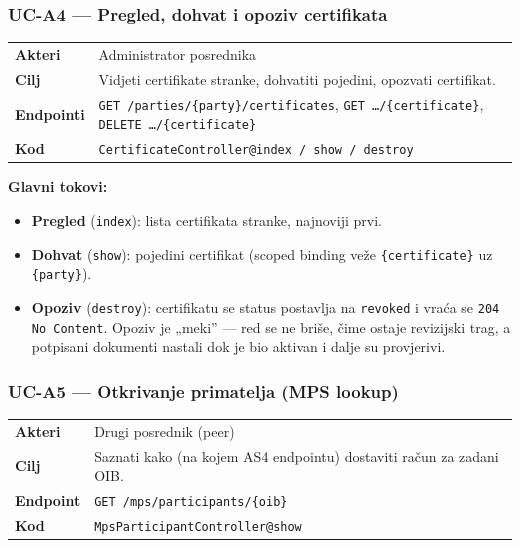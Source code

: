 \documentclass[11pt,a4paper]{article}
\begin{document}
\subsubsection{UC-A4 — Pregled, dohvat i opoziv certifikata}

\begin{tabularx}{\textwidth}{@{}lY@{}}
\toprule
\textbf{Akteri} & Administrator posrednika \\
\textbf{Cilj} & Vidjeti certifikate stranke, dohvatiti pojedini, opozvati certifikat. \\
\textbf{Endpointi} & \texttt{GET /parties/\{party\}/certificates}, \texttt{GET …/\{certificate\}}, \texttt{DELETE …/\{certificate\}} \\
\textbf{Kod} & \texttt{CertificateController@index / show / destroy} \\
\bottomrule
\end{tabularx}

\textbf{Glavni tokovi:}
\begin{itemize}[nosep]
  \item \textbf{Pregled} (\texttt{index}): lista certifikata stranke, najnoviji prvi.
  \item \textbf{Dohvat} (\texttt{show}): pojedini certifikat (scoped binding veže \texttt{\{certificate\}} uz \texttt{\{party\}}).
  \item \textbf{Opoziv} (\texttt{destroy}): certifikatu se status postavlja na \texttt{revoked} i vraća se
        \texttt{204 No Content}. Opoziv je „meki” — red se ne briše, čime ostaje revizijski trag, a
        potpisani dokumenti nastali dok je bio aktivan i dalje su provjerivi.
\end{itemize}

\subsubsection{UC-A5 — Otkrivanje primatelja (MPS lookup)}

\begin{tabularx}{\textwidth}{@{}lY@{}}
\toprule
\textbf{Akteri} & Drugi posrednik (peer) \\
\textbf{Cilj} & Saznati kako (na kojem AS4 endpointu) dostaviti račun za zadani OIB. \\
\textbf{Endpoint} & \texttt{GET /mps/participants/\{oib\}} \\
\textbf{Kod} & \texttt{MpsParticipantController@show} \\
\bottomrule
\end{tabularx}
\end{document}
